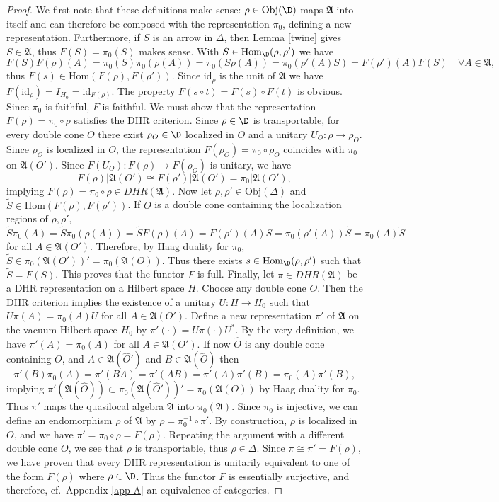 \documentclass[12pt]{article}
\newcommand{\alg}[1]{\mathfrak{#1}}
\theoremstyle{definition}
\theoremstyle{definition}
\theoremstyle{remark}
\newcommand{\Obj}{\mathrm{Obj}}
\def\al#1{{\mathfrak #1}}
\newcommand{\Hom}{\mathrm{Hom}}
\newcommand{\rarr}{\rightarrow}
\def\id{\mathrm{id}}
\begin{document}
\begin{proof}
  We first note that these definitions make sense:
  $\rho\in\Obj(\D)$ maps $\al A$ into itself and can
  therefore be composed with the representation
  $\pi_0$, defining a new representation. Furthermore,
  if $S$ is an arrow in $\Delta$, then Lemma
  \ref{twine} gives $S\in\al A$, thus $F(S)=\pi_0(S)$
  makes sense. With $S\in\Hom_\D(\rho,\rho')$ we have
  \[
  F(S)F(\rho)(A)=\pi_0(S)\pi_0(\rho(A))=\pi_0(S\rho(A))=\pi_0(\rho'(A)S)=F(\rho')(A)F(S)\quad\forall
  A\in\alg{A},\] thus $F(s)\in\Hom(F(\rho),F(\rho'))$. Since
  $\id_\rho$ is the unit of $\alg{A}$ we have
  $F(\id_\rho)=I_{H_0}=\id_{F(\rho)}$. The property $F(s\circ
  t)=F(s)\circ F(t)$ is obvious. Since $\pi_0$ is faithful, $F$ is
  faithful. We must show that the representation
  $F(\rho)=\pi_0\circ\rho$ satisfies the DHR criterion. Since
  $\rho\in\D$ is transportable, for every double cone $O$ there exist
  $\rho_O\in\D$ localized in $O$ and a unitary $U_O:\rho\rarr\rho_O$.
  Since $\rho_O$ is localized in $O$, the representation
  $F(\rho_O)=\pi_0\circ\rho_O$ coincides with $\pi_0$ on
  $\alg{A}(O')$. Since $F(U_O):F(\rho)\rarr F(\rho_O)$ is unitary, we
  have
\[ F(\rho)| \alg{A}(O')\cong F(\rho')| \alg{A}(O')=\pi_0|\alg{A}(O'), \]
implying $F(\rho)=\pi_0\circ\rho\in DHR(\alg{A})$. Now let $\rho,\rho'\in\Obj(\Delta)$ and 
$\tilde{S}\in\Hom(F(\rho),F(\rho'))$. If $O$ is a double cone containing the localization regions of $\rho,\rho'$,
\[
\tilde{S}\pi_0(A)=\tilde{S}\pi_0(\rho(A))=\tilde{S}F(\rho)(A)=F(\rho')(A)S=\pi_0(\rho'(A))\tilde{S}
=\pi_0(A)\tilde{S} \] for all $A\in\alg{A}(O')$.  Therefore, by Haag
duality for $\pi_0$,
$\tilde{S}\in\pi_0(\alg{A}(O'))'=\pi_0(\alg{A}(O))$. Thus there exists
$s\in\Hom_\D(\rho,\rho')$ such that $\tilde{S}=F(S)$. This proves that
the functor $F$ is full. Finally, let $\pi\in DHR(\alg{A})$ be a DHR
representation on a Hilbert space $H$. Choose any double cone $O$.
Then the DHR criterion implies the existence of a unitary $U:H\rarr
H_0$ such that $U\pi(A)=\pi_0(A)U$ for all $A\in\alg{A}(O')$. Define a
new representation $\pi'$ of $\alg{A}$ on the vacuum Hilbert space
$H_0$ by $\pi'(\cdot)=U\pi(\cdot)U^*$. By the very definition, we have
$\pi'(A)=\pi_0(A)$ for all $A\in\alg{A}(O')$. If now $\widehat{O}$ is
any double cone containing $O$, and $A\in\alg{A}(\widehat{O}')$ and
$B\in\alg{A}(\widehat{O})$ then
\[ \pi'(B)\pi_0(A)=\pi'(BA)=\pi'(AB)=\pi'(A)\pi'(B)=\pi_0(A)\pi'(B), \]
implying $\pi'(\alg{A}(\widehat{O}))\subset\pi_0(\alg{A}(\widehat{O}'))'=\pi_0(\alg{A}(O))$ by Haag duality for $\pi_0$. 
Thus $\pi'$ maps the quasilocal algebra $\alg{A}$ into $\pi_0(\alg{A})$. Since $\pi_0$ is injective, we can define an 
endomorphism $\rho$ of $\alg{A}$ by $\rho=\pi_0^{-1}\circ\pi'$. By construction, $\rho$ is localized in $O$, and we
have $\pi'=\pi_0\circ\rho=F(\rho)$. Repeating the argument with a different double cone $\tilde{O}$, we see that $\rho$ is
transportable, thus $\rho\in\Delta$. Since $\pi\cong\pi'=F(\rho)$, we have proven that every DHR representation is unitarily
equivalent to one of the form $F(\rho)$ where $\rho\in\D$. Thus the functor $F$ is essentially
surjective, and therefore, cf.\ Appendix \ref{app-A} an equivalence of categories.
\end{proof}
\end{document}
